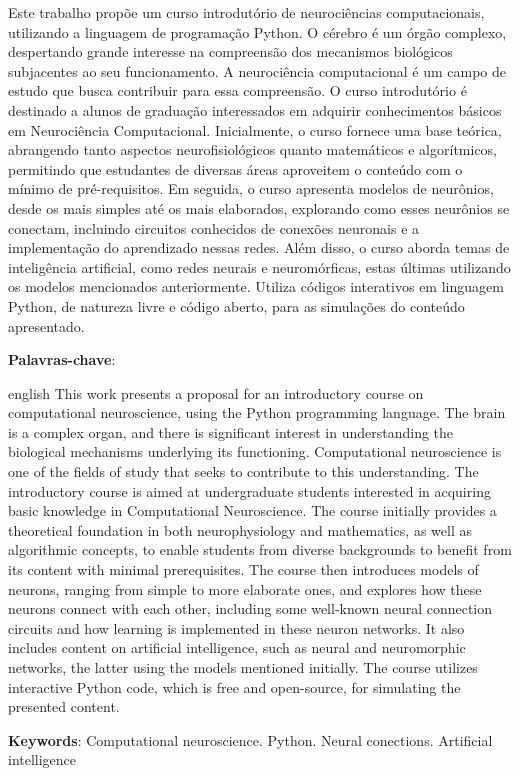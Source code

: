 \documentclass[
	12pt,				%
	openright,			%
	oneside,			%
	a4paper,			%
	chapter=TITLE,		%
	english,			%
	french,				%
	spanish,			%
	brazil				%
	]{abntex2}
\theoremstyle{definition}
\begin{document}
\setlength{\absparsep}{18pt}
\begin{resumo}
Este trabalho propõe um curso introdutório de neurociências computacionais, utilizando a linguagem de programação Python. O cérebro é um órgão complexo, despertando grande interesse na compreensão dos mecanismos biológicos subjacentes ao seu funcionamento. A neurociência computacional é um campo de estudo que busca contribuir para essa compreensão. O curso introdutório é destinado a alunos de graduação interessados em adquirir conhecimentos básicos em Neurociência Computacional. Inicialmente, o curso fornece uma base teórica, abrangendo tanto aspectos neurofisiológicos quanto matemáticos e algorítmicos, permitindo que estudantes de diversas áreas aproveitem o conteúdo com o mínimo de pré-requisitos. Em seguida, o curso apresenta modelos de neurônios, desde os mais simples até os mais elaborados, explorando como esses neurônios se conectam, incluindo circuitos conhecidos de conexões neuronais e a implementação do aprendizado nessas redes. Além disso, o curso aborda temas de inteligência artificial, como redes neurais e neuromórficas, estas últimas utilizando os modelos mencionados anteriormente. Utiliza códigos interativos em linguagem Python, de natureza livre e código aberto, para as simulações do conteúdo apresentado.
%

\textbf{Palavras-chave}: \imprimirpalavraschave
\end{resumo}

\begin{resumo}[Abstract]
 \begin{otherlanguage*}{english}
This work presents a proposal for an introductory course on computational neuroscience, using the Python programming language. The brain is a complex organ, and there is significant interest in understanding the biological mechanisms underlying its functioning. Computational neuroscience is one of the fields of study that seeks to contribute to this understanding. The introductory course is aimed at undergraduate students interested in acquiring basic knowledge in Computational Neuroscience. The course initially provides a theoretical foundation in both neurophysiology and mathematics, as well as algorithmic concepts, to enable students from diverse backgrounds to benefit from its content with minimal prerequisites. The course then introduces models of neurons, ranging from simple to more elaborate ones, and explores how these neurons connect with each other, including some well-known neural connection circuits and how learning is implemented in these neuron networks. It also includes content on artificial intelligence, such as neural and neuromorphic networks, the latter using the models mentioned initially. The course utilizes interactive Python code, which is free and open-source, for simulating the presented content.

   \noindent 
   \textbf{Keywords}: Computational neuroscience. Python. Neural conections. Artificial intelligence
 \end{otherlanguage*}
\end{resumo}
\end{document}
